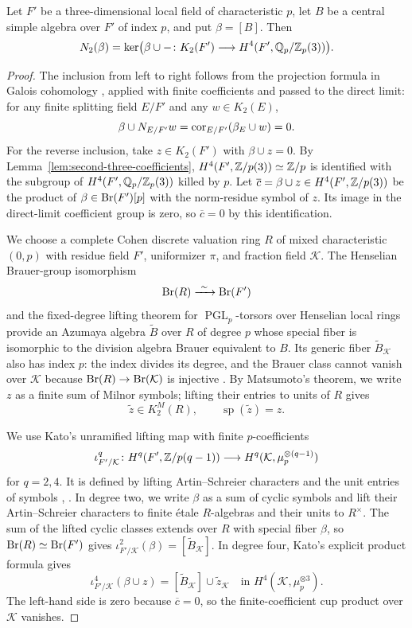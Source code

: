 \begin{lemma}\label{lem:second-three-char-p-index-p}
Let $F'$ be a three-dimensional local field of characteristic $p$, let $B$ be a central simple algebra over $F'$ of index $p$, and put $\beta=[B]$.
Then
\[
 N_2(\beta)
 =\ker\bigl(\beta\cup-\colon K_2(F')
       \longrightarrow H^4(F',\mathbb Q_p/\mathbb Z_p(3))\bigr).
\]
\end{lemma}
\begin{proof}
The inclusion from left to right follows from the projection formula in Galois cohomology \cite[\S2 (C3)]{Otabe2023}, applied with finite coefficients and passed to the direct limit: for any finite splitting field $E/F'$ and any $w\in K_2(E)$,
\[
 \beta\cup N_{E/F'}w
 =\operatorname{cor}_{E/F'}(\beta_E\cup w)=0.
\]
For the reverse inclusion, take $z\in K_2(F')$ with $\beta\cup z=0$.
By Lemma~\ref{lem:second-three-coefficients}, $H^4(F',\mathbb Z/p(3))\simeq\mathbb Z/p$ is identified with the subgroup of $H^4(F',\mathbb Q_p/\mathbb Z_p(3))$ killed by $p$.
Let $\overline c=\beta\cup z\in H^4(F',\mathbb Z/p(3))$ be the product of $\beta\in\operatorname{Br}(F')[p]$ with the norm-residue symbol of $z$.
Its image in the direct-limit coefficient group is zero, so $\overline c=0$ by this identification.

We choose a complete Cohen discrete valuation ring $R$ of mixed characteristic $(0,p)$ with residue field $F'$, uniformizer $\pi$, and fraction field $\mathcal K$.
The Henselian Brauer-group isomorphism \cite[IV, Corollary 2.13]{MilneEtale}
\[
 \operatorname{Br}(R)\xrightarrow{\ \sim\ }\operatorname{Br}(F')
\]
and the fixed-degree lifting theorem for $\operatorname{PGL}_p$-torsors over Henselian local rings \cite[Expos\'e XXIV, Proposition 8.1]{SGA3} provide an Azumaya algebra $\widetilde B$ over $R$ of degree $p$ whose special fiber is isomorphic to the division algebra Brauer equivalent to $B$.
Its generic fiber $\widetilde B_{\mathcal K}$ also has index $p$: the index divides its degree, and the Brauer class cannot vanish over $\mathcal K$ because $\operatorname{Br}(R)\to\operatorname{Br}(\mathcal K)$ is injective \cite[IV, Corollary 2.6]{MilneEtale}.
By Matsumoto's theorem, we write $z$ as a finite sum of Milnor symbols; lifting their entries to units of $R$ gives
\[
 \widetilde z\in K_2^M(R),\qquad
 \operatorname{sp}(\widetilde z)=z.
\]

We use Kato's unramified lifting map with finite $p$-coefficients
\[
 \iota_{F'/\mathcal K}^q\colon
 H^q(F',\mathbb Z/p(q-1))
 \longrightarrow H^q(\mathcal K,\mu_p^{\otimes(q-1)})
\]
for $q=2,4$.
It is defined by lifting Artin--Schreier characters and the unit entries of symbols \cite[Theorem~3]{KatoGaloisCohomology1982}, \cite[\S5.1]{Kurihara2000}.
In degree two, we write $\beta$ as a sum of cyclic symbols and lift their Artin--Schreier characters to finite \'etale $R$-algebras and their units to $R^\times$.
The sum of the lifted cyclic classes extends over $R$ with special fiber $\beta$, so $\operatorname{Br}(R)\simeq\operatorname{Br}(F')$ gives $\iota_{F'/\mathcal K}^2(\beta)=[\widetilde B_{\mathcal K}]$.
In degree four, Kato's explicit product formula gives
\[
 \iota_{F'/\mathcal K}^4(\beta\cup z)
  =[\widetilde B_{\mathcal K}]\cup\widetilde z_{\mathcal K}
  \quad\text{in }H^4(\mathcal K,\mu_p^{\otimes3}).
\]
The left-hand side is zero because $\overline c=0$, so the finite-coefficient cup product over $\mathcal K$ vanishes.


\end{proof}
